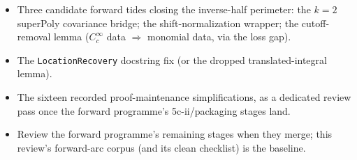 \documentclass[11pt]{article}
\begin{document}
\begin{itemize}[nosep]
\item Three candidate forward tides closing the inverse-half perimeter: the
$k=2$ superPoly covariance bridge; the shift-normalization wrapper; the
cutoff-removal lemma ($C_c^\infty$ data $\Rightarrow$ monomial data, via the
loss gap).
\item The \texttt{LocationRecovery} docstring fix (or the dropped
translated-integral lemma).
\item The sixteen recorded proof-maintenance simplifications, as a
dedicated review pass once the forward programme's 5c-ii/packaging stages
land.
\item Review the forward programme's remaining stages when they merge; this
review's forward-arc corpus (and its clean checklist) is the baseline.
\end{itemize}
\end{document}
